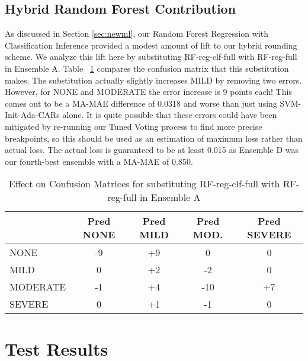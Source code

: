 
\subsection{Hybrid Random Forest Contribution} As discussed in Section \ref{sec:newml}, our Random Forest Regression with Classification Inference provided a modest amount of lift to our hybrid rounding scheme. We analyze this lift here by substituting \textsf{RF-reg-clf-full} with \textsf{RF-reg-full} in Ensemble A. Table ~\ref{tab:substituteRF} compares the confusion matrix that this substitution makes. The substitution actually slightly increases \textsf{MILD} by removing two errors. However, for \textsf{NONE} and \textsf{MODERATE} the error increase is 9 points each! This comes out to be a MA-MAE difference of 0.0318 and worse than just using \textsf{SVM-Init-Ada-CARs} alone. It is quite possible that these errors could have been mitigated by re-running our Tuned Voting process to find more precise breakpoints, so this should be used as an estimation of maximum loss rather than actual loss. The actual loss is guaranteed to be at least 0.015 as Ensemble D was our fourth-best ensemble with a MA-MAE of 0.850.

\begin{table}[H]
\centering
    \begin{tabular}{|l|c|c|c|c|}
   \hline
   \textsf{ \cellcolor{gray!15}} & \textsf{ Pred NONE } & \textsf{ Pred MILD } & \textsf{ Pred MOD. } & \textsf{ Pred SEVERE } \\ 
    \hline
    \textsf{ NONE } & -9 & +9 & 0 & 0 \\ 
    \textsf{ MILD } & 0 & +2 & -2 & 0 \\ 
    \textsf{ MODERATE } & -1 & +4 & -10 & +7 \\ 
    \textsf{ SEVERE } & 0 & +1 & -1 & 0 \\ 
   \hline
   \end{tabular}
   \caption{Effect on Confusion Matrices for substituting RF-reg-clf-full with RF-reg-full in Ensemble A}
   \label{tab:substituteRF}
\end{table}


\section{Test Results}



